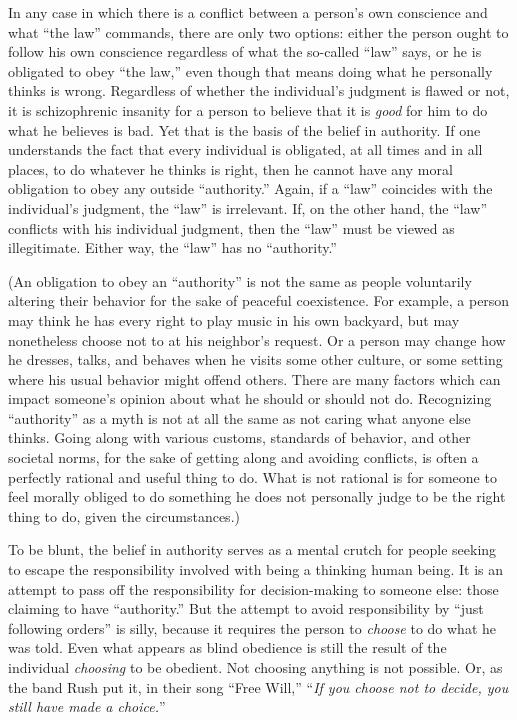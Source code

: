 \documentclass{book}
\begin{document}
In any case in which there is a conflict between a person's own conscience and what \enquote{the law} commands, there are only two options: either the person ought to follow his own conscience regardless of what the so-called \enquote{law} says, or he is obligated to obey \enquote{the law,} even though that means doing what he personally thinks is wrong. Regardless of whether the individual's judgment is flawed or not, it is schizophrenic insanity for a person to believe that it is \emph{good} for him to do what he believes is bad. Yet that is the basis of the belief in authority. If one understands the fact that every individual is obligated, at all times and in all places, to do whatever he thinks is right, then he cannot have any moral obligation to obey any outside \enquote{authority.} Again, if a \enquote{law} coincides with the individual's judgment, the \enquote{law} is irrelevant. If, on the other hand, the \enquote{law} conflicts with his individual judgment, then the \enquote{law} must be viewed as illegitimate. Either way, the \enquote{law} has no \enquote{authority.}

(An obligation to obey an \enquote{authority} is not the same as people voluntarily altering their behavior for the sake of peaceful coexistence. For example, a person may think he has every right to play music in his own backyard, but may nonetheless choose not to at his neighbor's request. Or a person may change how he dresses, talks, and behaves when he visits some other culture, or some setting where his usual behavior might offend others. There are many factors which can impact someone's opinion about what he should or should not do. Recognizing \enquote{authority} as a myth is not at all the same as not caring what anyone else thinks. Going along with various customs, standards of behavior, and other societal norms, for the sake of getting along and avoiding conflicts, is often a perfectly rational and useful thing to do. What is not rational is for someone to feel morally obliged to do something he does not personally judge to be the right thing to do, given the circumstances.)

To be blunt, the belief in authority serves as a mental crutch for people seeking to escape the responsibility involved with being a thinking human being. It is an attempt to pass off the responsibility for decision-making to someone else: those claiming to have \enquote{authority.} But the attempt to avoid responsibility by \enquote{just following orders} is silly, because it requires the person to \emph{choose} to do what he was told. Even what appears as blind obedience is still the result of the individual \emph{choosing} to be obedient. Not choosing anything is not possible. Or, as the band Rush put it, in their song \enquote{Free Will,} \enquote{\emph{If you choose not to decide, you still have made a choice.}}
\end{document}
